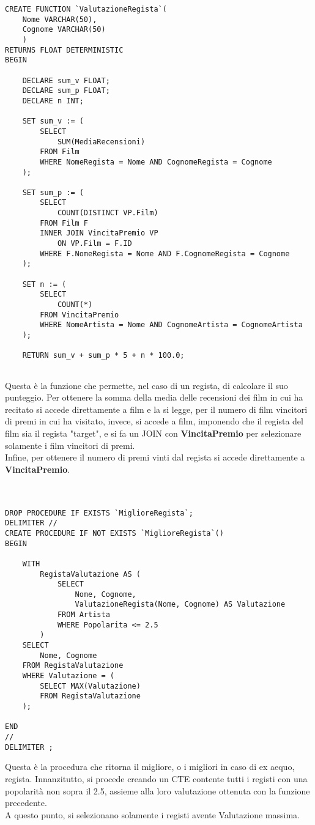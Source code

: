 \documentclass{article}
\begin{document}
\begin{lstlisting}
CREATE FUNCTION `ValutazioneRegista`(
    Nome VARCHAR(50),
    Cognome VARCHAR(50)
    )
RETURNS FLOAT DETERMINISTIC
BEGIN

    DECLARE sum_v FLOAT;
    DECLARE sum_p FLOAT;
    DECLARE n INT;

    SET sum_v := (
        SELECT
            SUM(MediaRecensioni)
        FROM Film
        WHERE NomeRegista = Nome AND CognomeRegista = Cognome
    );

    SET sum_p := (
        SELECT
            COUNT(DISTINCT VP.Film)
        FROM Film F
        INNER JOIN VincitaPremio VP
            ON VP.Film = F.ID
        WHERE F.NomeRegista = Nome AND F.CognomeRegista = Cognome
    );

    SET n := (
        SELECT
            COUNT(*)
        FROM VincitaPremio
        WHERE NomeArtista = Nome AND CognomeArtista = CognomeArtista
    );

    RETURN sum_v + sum_p * 5 + n * 100.0;


\end{lstlisting} 
Questa è la funzione che permette, nel caso di un regista, di calcolare il suo punteggio. Per ottenere la somma della media delle recensioni dei film in cui ha recitato si accede direttamente a film e la si legge, per il numero di film vincitori di premi in cui ha visitato, invece, si accede a film, imponendo che il regista del film sia il regista "target", e si fa un JOIN con \textbf{VincitaPremio} per selezionare solamente i film vincitori di premi. \\
Infine, per ottenere il numero di premi vinti dal regista si accede direttamente a \textbf{VincitaPremio}. \\ \\ \\ 
\begin{lstlisting}
DROP PROCEDURE IF EXISTS `MiglioreRegista`;
DELIMITER //
CREATE PROCEDURE IF NOT EXISTS `MiglioreRegista`()
BEGIN

    WITH
        RegistaValutazione AS (
            SELECT
                Nome, Cognome,
                ValutazioneRegista(Nome, Cognome) AS Valutazione
            FROM Artista
            WHERE Popolarita <= 2.5
        )
    SELECT
        Nome, Cognome
    FROM RegistaValutazione
    WHERE Valutazione = (
        SELECT MAX(Valutazione)
        FROM RegistaValutazione
    );

END
//
DELIMITER ;
\end{lstlisting}
Questa è la procedura che ritorna il migliore, o i migliori in caso di ex aequo, regista. Innanzitutto, si procede creando un CTE contente tutti i registi con una popolarità non sopra il 2.5, assieme alla loro valutazione ottenuta con la funzione precedente. \\
A questo punto, si selezionano solamente i registi avente Valutazione massima.
\end{document}

